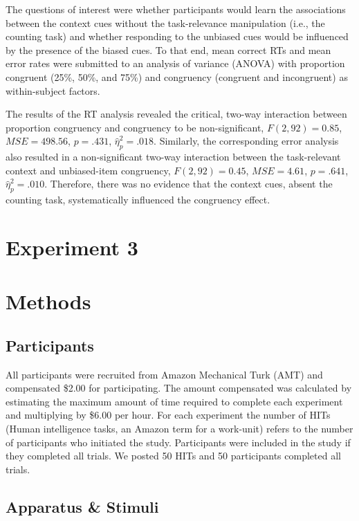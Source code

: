 \documentclass[english,,man,floatsintext]{apa6}
\begin{document}
The questions of interest were whether participants would learn the associations between the context cues without the task-relevance manipulation (i.e., the counting task) and whether responding to the unbiased cues would be influenced by the presence of the biased cues. To that end, mean correct RTs and mean error rates were submitted to an analysis of variance (ANOVA) with proportion congruent (25\%, 50\%, and 75\%) and congruency (congruent and incongruent) as within-subject factors.

The results of the RT analysis revealed the critical, two-way interaction between proportion congruency and congruency to be non-significant, \(F(2, 92) = 0.85\), \(\mathit{MSE} = 498.56\), \(p = .431\), \(\hat{\eta}^2_p = .018\). Similarly, the corresponding error analysis also resulted in a non-significant two-way interaction between the task-relevant context and unbiased-item congruency, \(F(2, 92) = 0.45\), \(\mathit{MSE} = 4.61\), \(p = .641\), \(\hat{\eta}^2_p = .010\). Therefore, there was no evidence that the context cues, absent the counting task, systematically influenced the congruency effect.

\hypertarget{experiment-3}{%
\section{Experiment 3}\label{experiment-3}}

\hypertarget{methods-2}{%
\section{Methods}\label{methods-2}}

\hypertarget{participants-2}{%
\subsection{Participants}\label{participants-2}}

All participants were recruited from Amazon Mechanical Turk (AMT) and compensated \$2.00 for participating. The amount compensated was calculated by estimating the maximum amount of time required to complete each experiment and multiplying by \$6.00 per hour. For each experiment the number of HITs (Human intelligence tasks, an Amazon term for a work-unit) refers to the number of participants who initiated the study. Participants were included in the study if they completed all trials. We posted 50 HITs and 50 participants completed all trials.

\hypertarget{apparatus-stimuli-2}{%
\subsection{Apparatus \& Stimuli}\label{apparatus-stimuli-2}}
\end{document}
